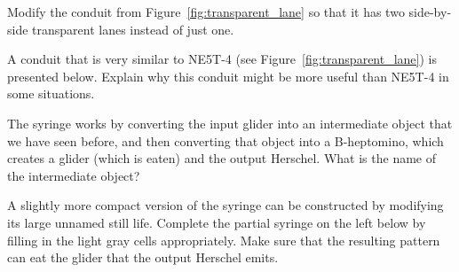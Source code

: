 \begin{multicols}{2}
	
	\mfilbreak
	
	
	\begin{problemstar}\label{exer:two_transparent_lanes} 
		Modify the conduit from Figure~\ref{fig:transparent_lane} so that it has two side-by-side transparent lanes instead of just one.
		
	\end{problemstar}
	
	
	\mfilbreak
	
	
	\begin{problemstar}\label{exer:H_to_G_transparent_better} 
		A conduit that is very similar to NE5T-4 (see Figure~\ref{fig:transparent_lane}) is presented below. Explain why this conduit might be more useful than NE5T-4 in some situations.
		
		\begin{center}
		\end{center}
	\end{problemstar}
	
	
	\mfilbreak
	
	
	\begin{problemstar}\label{exer:syringe_creates_pi} 
		The syringe works by converting the input glider into an intermediate object that we have seen before, and then converting that object into a B-heptomino, which creates a glider (which is eaten) and the output Herschel. What is the name of the intermediate object?
	\end{problemstar}
	
	
	\mfilbreak
	
	\begin{problemstar}\label{exer:syringe_compact} 
		A slightly more compact version of the syringe can be constructed by modifying its large unnamed still life. Complete the partial syringe on the left below by filling in the light gray cells appropriately. Make sure that the resulting pattern can eat the glider that the output Herschel emits.\\[-0.75cm]
		
		\begin{center}
			~\quad~
		\end{center}
		
	\end{problemstar}
	

\end{multicols}
